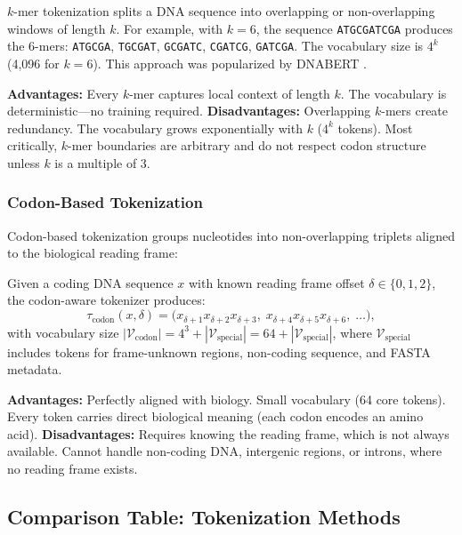 $k$-mer tokenization splits a DNA sequence into overlapping or non-overlapping windows of length $k$. For example, with $k = 6$, the sequence \texttt{ATGCGATCGA} produces the 6-mers: \texttt{ATGCGA}, \texttt{TGCGAT}, \texttt{GCGATC}, \texttt{CGATCG}, \texttt{GATCGA}. The vocabulary size is $4^k$ (4,096 for $k = 6$). This approach was popularized by DNABERT \citep{ji2021}.

\textbf{Advantages:} Every $k$-mer captures local context of length $k$. The vocabulary is deterministic---no training required. \textbf{Disadvantages:} Overlapping $k$-mers create redundancy. The vocabulary grows exponentially with $k$ ($4^k$ tokens). Most critically, $k$-mer boundaries are arbitrary and do not respect codon structure unless $k$ is a multiple of 3.

\subsubsection{Codon-Based Tokenization}
\label{sec:codon-tokenization}

Codon-based tokenization groups nucleotides into non-overlapping triplets aligned to the biological reading frame:

\begin{dogmadef}
Given a coding DNA sequence $x$ with known reading frame offset $\delta \in \{0, 1, 2\}$, the codon-aware tokenizer produces:
\begin{equation}
\tau_{\text{codon}}(x, \delta) = \bigl(x_{\delta+1}x_{\delta+2}x_{\delta+3},\; x_{\delta+4}x_{\delta+5}x_{\delta+6},\; \ldots\bigr),
\end{equation}
with vocabulary size $|\mathcal{V}_{\text{codon}}| = 4^3 + |\mathcal{V}_{\text{special}}| = 64 + |\mathcal{V}_{\text{special}}|$, where $\mathcal{V}_{\text{special}}$ includes tokens for frame-unknown regions, non-coding sequence, and FASTA metadata.
\end{dogmadef}

\textbf{Advantages:} Perfectly aligned with biology. Small vocabulary (64 core tokens). Every token carries direct biological meaning (each codon encodes an amino acid). \textbf{Disadvantages:} Requires knowing the reading frame, which is not always available. Cannot handle non-coding DNA, intergenic regions, or introns, where no reading frame exists.

\subsection{Comparison Table: Tokenization Methods}

